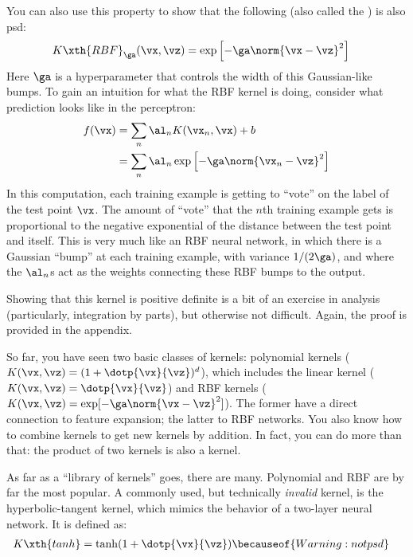You can also use this property to show that the following
 (also called the ) is
also psd:
%
\begin{align}
K\xth{RBF}_\ga(\vx,\vz) &= \exp\left[ - \ga \norm{\vx-\vz}^2 \right]
\end{align}
%
Here $\ga$ is a hyperparameter that controls the width of this
Gaussian-like bumps.  To gain an intuition for what the RBF kernel is
doing, consider what prediction looks like in the perceptron:
%
\begin{align}
f(\vx) &= \sum_n \al_n K(\vx_n, \vx) + b \\
&= \sum_n \al_n \exp\left[ - \ga \norm{\vx_n-\vz}^2 \right]
\end{align}
%
In this computation, each training example is getting to ``vote'' on
the label of the test point $\vx$.  The amount of ``vote'' that the
$n$th training example gets is proportional to the negative
exponential of the distance between the test point and itself.  This
is very much like an RBF neural network, in which there is a Gaussian
``bump'' at each training example, with variance $1/(2\ga)$, and where
the $\al_n$s act as the weights connecting these RBF bumps to the
output.

Showing that this kernel is positive definite is a bit of an exercise
in analysis (particularly, integration by parts), but otherwise not
difficult.  Again, the proof is provided in the appendix.

So far, you have seen two basic classes of kernels: polynomial kernels
($K(\vx,\vz) = (1 + \dotp{\vx}{\vz})^d$), which includes the linear
kernel ($K(\vx,\vz) = \dotp{\vx}{\vz}$) and RBF kernels ($K(\vx,\vz) =
\exp[-\ga \norm{\vx-\vz}^2]$).  The former have a direct connection to
feature expansion; the latter to RBF networks.  You also know how to
combine kernels to get new kernels by addition.  In fact, you can do
more than that: the product of two kernels is also a kernel.

As far as a ``library of kernels'' goes, there are many.  Polynomial
and RBF are by far the most popular.  A commonly used, but technically
\emph{invalid} kernel, is the hyperbolic-tangent kernel, which mimics
the behavior of a two-layer neural network.  It is defined as:
%
\begin{align}
K\xth{tanh} &= \tanh(1 + \dotp{\vx}{\vz})
\becauseof{Warning: not psd}
\end{align}

